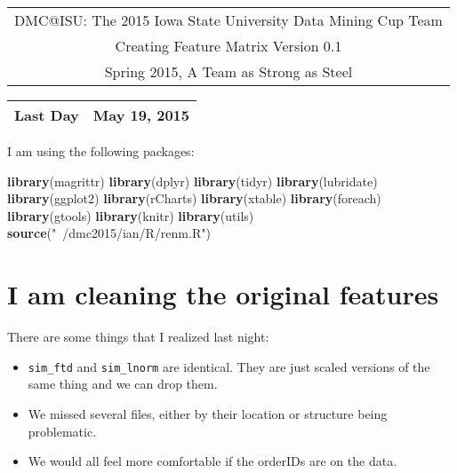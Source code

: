 \documentclass[10pt]{report}
\newenvironment{Shaded}{}{}
\newcommand{\KeywordTok}[1]{\textcolor[rgb]{0.00,0.44,0.13}{\textbf{{#1}}}}
\newcommand{\StringTok}[1]{\textcolor[rgb]{0.25,0.44,0.63}{{#1}}}
\newcommand{\NormalTok}[1]{{#1}}
\begin{document}
\thispagestyle{empty}%
\begin{center}%
    \renewcommand{\arraystretch}{1.5}%
    \begin{tabular}{c}%
       \Large{DMC@ISU: The 2015 Iowa State University Data Mining Cup Team}\\
       Creating Feature Matrix Version 0.1\\
       Spring 2015, A Team as Strong as Steel \\
    \end{tabular}
\end{center}

\begin{center}
 \renewcommand{\arraystretch}{1.5}
 \begin{tabular*}{0.65\textwidth}{r@{:\hspace{.3cm}}l}
    \hline
    
    
    Last Day&  May 19, 2015\\
    \hline
 \end{tabular*}
\end{center}

I am using the following packages:

\begin{Shaded}
\begin{Highlighting}[]
   \KeywordTok{library}\NormalTok{(magrittr)}
   \KeywordTok{library}\NormalTok{(dplyr)}
   \KeywordTok{library}\NormalTok{(tidyr)}
   \KeywordTok{library}\NormalTok{(lubridate)}
   \KeywordTok{library}\NormalTok{(ggplot2)}
   \KeywordTok{library}\NormalTok{(rCharts)}
   \KeywordTok{library}\NormalTok{(xtable)}
   \KeywordTok{library}\NormalTok{(foreach)}
   \KeywordTok{library}\NormalTok{(gtools)}
   \KeywordTok{library}\NormalTok{(knitr)}
   \KeywordTok{library}\NormalTok{(utils)}
   \KeywordTok{source}\NormalTok{(}\StringTok{"~/dmc2015/ian/R/renm.R"}\NormalTok{)}
\end{Highlighting}
\end{Shaded}

\section{I am cleaning the original
features}\label{i-am-cleaning-the-original-features}

There are some things that I realized last night:

\begin{itemize}
\item
  \verb!sim_ftd! and \verb!sim_lnorm! are identical. They are just
  scaled versions of the same thing and we can drop them.
\item
  We missed several files, either by their location or structure being
  problematic.
\item
  We would all feel more comfortable if the orderIDs are on the data.
\end{itemize}
\end{document}
